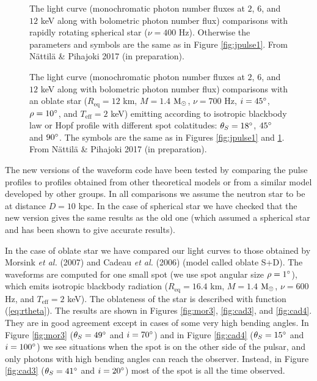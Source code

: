 \documentclass{wihuri}
\def\msun{{\rm M_{\odot}}}
\def\thetas{\theta_{S}}
\def\req{R_{\mathrm{eq}}}
\begin{document}
\begin{figure}
\centerline{}
\caption{The light curve (monochromatic photon number fluxes at $2$, $6$, and $12$ keV along with bolometric photon number flux) comparisons with rapidly rotating spherical star ($\nu = 400$ Hz). Otherwise the parameters and symbols are the same as in Figure \ref{fig:jpulse1}. From Nättilä \& Pihajoki 2017 (in preparation).
\label{fig:jpulse2}}
\end{figure}


\begin{figure}
\centerline{}
\caption{The light curve (monochromatic photon number fluxes at $2$, $6$, and $12$ keV along with bolometric photon number flux) comparisons with an oblate star ($\req = 12$ km, $M = 1.4$ $\msun$, $\nu = 700$ Hz, $i = 45 \degree$, $\rho = 10 \degree$, and $T_{\mathrm{eff}} = 2$ keV) emitting according to isotropic blackbody law or Hopf profile with different spot colatitudes: $\thetas = 18 \degree$, $45 \degree$ and $90 \degree$. The symbols are the same as in Figures \ref{fig:jpulse1} and \ref{fig:jpulse2}. From Nättilä \& Pihajoki 2017 (in preparation).
\label{fig:jpulse3}}
\end{figure}



The new versions of the waveform code have been tested by comparing the pulse profiles to profiles obtained from other theoretical models or from a similar model developed by other groups. In all comparisons we assume the neutron star to be at distance $D = 10$ kpc. In the case of spherical star we have checked that the new version gives the same results as the old one \cite{poutabelo} (which assumed a spherical star and has been shown to give accurate results). 

In the case of oblate star we have compared our light curves to those obtained by Morsink {\it et al.} (2007) \cite{morsink} and Cadeau {\it et al.} (2006) \cite{cadeau} (model called oblate S+D). The waveforms are computed for one small spot (we use spot angular size $\rho = 1 \degree$), which emits isotropic blackbody radiation ($\req = 16.4$ km, $M = 1.4$  $\msun$, $\nu = 600$ Hz, and $T_{\mathrm{eff}} = 2$ keV). The oblateness of the star is described with function (\ref{eq:rtheta}). The results are shown in Figures \ref{fig:mor3}, \ref{fig:cad3}, and \ref{fig:cad4}. They are in good agreement except in cases of some very high bending angles. In Figure \ref{fig:mor3} ($\thetas = 49 \degree$ and $i = 70 \degree$) and in Figure \ref{fig:cad4} ($\thetas = 15 \degree$ and $i = 100 \degree$) we see situations when the spot is on the other side of the pulsar, and only photons with high bending angles can reach the observer. Instead, in Figure \ref{fig:cad3} ($\thetas = 41 \degree$ and $i = 20 \degree$) most of the spot is all the time observed. 
\end{document}
